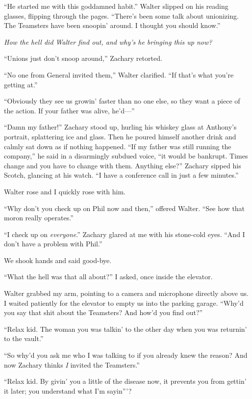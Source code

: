 ``He started me with this goddamned habit.'' Walter slipped on his
reading glasses, flipping through the pages. ``There's been some talk
about unionizing. The Teamsters have been snoopin' around. I thought you
should know.''

\emph{How the hell did Walter find out, and why's he bringing this up
now?}

``Unions just don't snoop around,'' Zachary retorted.

``No one from General invited them,'' Walter clarified. ``If that's what
you're getting at.''

``Obviously they see us growin' faster than no one else, so they want a
piece of the action. If your father was alive, he'd---''

``Damn my father!'' Zachary stood up, hurling his whiskey glass at
Anthony's portrait, splattering ice and glass. Then he poured himself
another drink and calmly sat down as if nothing happened. ``If my father
was still running the company,'' he said in a disarmingly subdued voice,
``it would be bankrupt. Times change and you have to change with them.
Anything else?'' Zachary sipped his Scotch, glancing at his watch. ``I
have a conference call in just a few minutes.''

Walter rose and I quickly rose with him.

``Why don't you check up on Phil now and then,'' offered Walter. ``See
how that moron really operates.''

``I check up on \emph{everyone}.'' Zachary glared at me with his
stone-cold eyes. ``And I don't have a problem with Phil.''

We shook hands and said good-bye.

``What the hell was that all about?'' I asked, once inside the elevator.

Walter grabbed my arm, pointing to a camera and microphone directly
above us. I waited patiently for the elevator to empty us into the
parking garage. ``Why'd you say that shit about the Teamsters? And how'd
you find out?''

``Relax kid. The woman you was talkin' to the other day when you was
returnin' to the vault.''

``So why'd you ask me who I was talking to if you already knew the
reason? And now Zachary thinks \emph{I} invited the Teamsters.''

``Relax kid. By givin' you a little of the disease now, it prevents you
from gettin' it later; you understand what I'm sayin'''?

